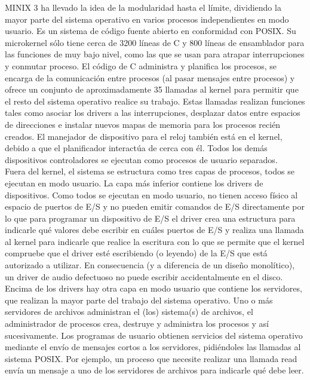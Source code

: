 \documentclass[10pt,a4paper,spanish]{report}
\begin{document}
  \noindent
  MINIX 3 ha llevado la idea de la modularidad hasta el límite, dividiendo la mayor parte del sistema operativo en varios procesos independientes en modo usuario. Es un sistema de código fuente abierto en conformidad con POSIX. Su microkernel sólo tiene cerca de 3200 líneas de C y 800 líneas de ensamblador para las funciones de muy bajo nivel, como las que se usan para atrapar interrupciones y conmutar proceso. El código de C administra y planifica los procesos, se encarga de la comunicación entre procesos (al pasar mensajes entre procesos) y ofrece un conjunto de aproximadamente 35 llamadas al kernel para permitir que el resto del sistema operativo realice su trabajo. Estas llamadas realizan funciones tales como asociar los drivers a las interrupciones, desplazar datos entre espacios de direcciones e instalar nuevos mapas de memoria para los procesos recién creados. El manejador de dispositivo para el reloj también está en el kernel, debido a que el planificador interactúa de cerca con él. Todos los demás dispositivos controladores se ejecutan como procesos de usuario separados. \\

  \noindent
  Fuera del kernel, el sistema se estructura como tres capas de procesos, todos se ejecutan en modo usuario. La capa más inferior contiene los drivers de dispositivos. Como todos se ejecutan en modo usuario, no tienen acceso físico al espacio de puertos de E/S y no pueden emitir comandos de E/S directamente por lo que para programar un dispositivo de E/S el driver crea una estructura para indicarle qué valores debe escribir en cuáles puertos de E/S y realiza una llamada al kernel para indicarle que realice la escritura con lo que se permite que el kernel compruebe que el driver esté escribiendo (o leyendo) de la E/S que está autorizado a utilizar. En consecuencia (y a diferencia de un diseño monolítico), un driver de audio defectuoso no puede escribir accidentalmente
  en el disco. \\

  \noindent
  Encima de los drivers hay otra capa en modo usuario que contiene los servidores, que realizan la mayor parte del trabajo del sistema operativo. Uno o más servidores de archivos administran el (los) sistema(s) de archivos, el administrador de procesos crea, destruye y administra los procesos y así sucesivamente. Los programas de usuario obtienen servicios del sistema operativo mediante el envío de mensajes cortos a los servidores, pidiéndoles las llamadas al sistema POSIX. Por ejemplo, un proceso que necesite realizar una llamada read envía un mensaje a uno de los servidores de archivos para indicarle qué debe leer. \\
\end{document}
